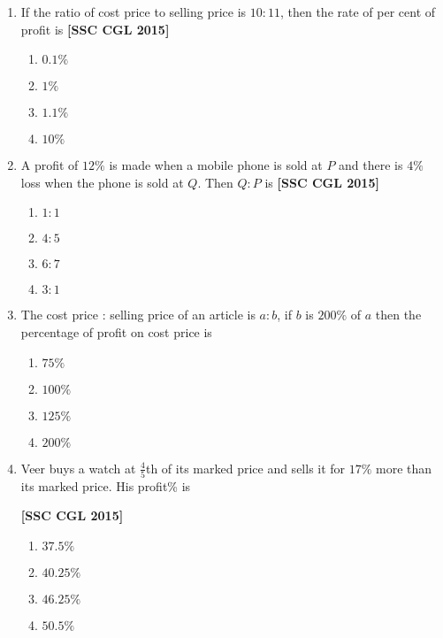 \documentclass[twocolumn]{article}
\begin{document}
\begin{enumerate}
        \item If the ratio of cost price to selling price is $10: 11$, then the rate of per cent of profit is \hfill {\bf[SSC CGL 2015]}
            \begin{enumerate}
                \item $0.1 \%$
                \item $1 \%$
                \item $1.1 \%$
                \item $10 \%$
            \end{enumerate}
        
        \item A profit of $12 \%$ is made when a mobile phone is sold at \rupee$P$ and there is $4 \%$ loss when the phone is sold at \rupee$Q$. Then $Q: P$ is \hfill {\bf[SSC CGL 2015]}
            \begin{enumerate}
                \item $1: 1$
                \item $4: 5$
                \item $6: 7$
                \item $3: 1$
            \end{enumerate}

        \item The cost price : selling price of an article is $a: b$, if $b$ is $200 \%$ of $a$ then the percentage of profit on cost price is
            \begin{enumerate}
                \item $75 \%$
                \item $100 \%$
                \item $125 \%$
                \item $200 \%$
            \end{enumerate}
        
        \item Veer buys a watch at $\frac{4}{5}$th of its marked price and sells it for $17 \%$ more than its marked price. His profit\% is  \\ \strut\hfill {\bf[SSC CGL 2015]}
            \begin{enumerate}
                \item $37.5 \%$
                \item $40.25 \%$
                \item $46.25 \%$
                \item $50.5 \%$
            \end{enumerate}
        

\end{enumerate}
\end{document}
